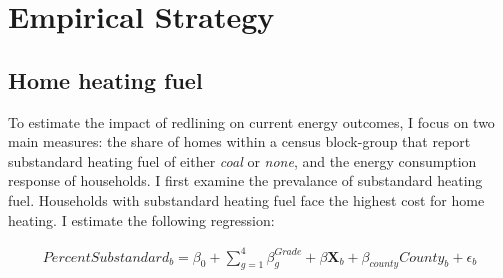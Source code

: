 \documentclass[
]{article}
\begin{document}
\hypertarget{empirical-strategy}{%
\section{Empirical Strategy}\label{empirical-strategy}}

\hypertarget{home-heating-fuel}{%
\subsection{Home heating fuel}\label{home-heating-fuel}}

To estimate the impact of redlining on current energy outcomes, I focus on two main measures: the share of homes within a census block-group that report substandard heating fuel of either \textit{coal} or \textit{none}, and the energy consumption response of households. I first examine the prevalance of substandard heating fuel. Households with substandard heating fuel face the highest cost for home heating. I estimate the following regression:

\begin{eqnarray}
PercentSubstandard_{b} = \beta_0 + \sum_{g=1}^4 \beta_{g}^{Grade} +  \beta \mathbf{X}_b + \beta_{county} County_b + \epsilon_{b} \label{mainSubtandard1}
\end{eqnarray}
\end{document}
